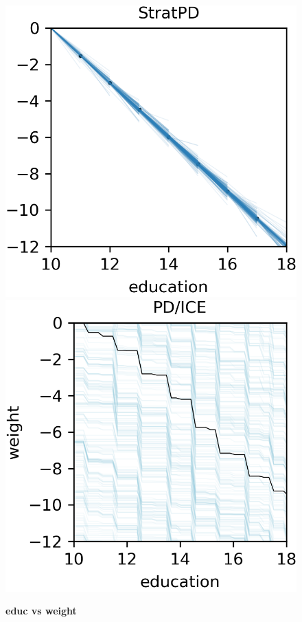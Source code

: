 \documentclass[12pt]{article}
\begin{document}
\begin{figure}[htbp]
\begin{center}
\includegraphics[scale=0.7]{images/education_vs_weight_stratpd.png}
\includegraphics[scale=0.7]{images/education_vs_weight_pdp.png}
\caption{{\bf  educ vs weight}}
\label{fig:education_vs_weight}
\end{center}
\end{figure}
\end{document}
